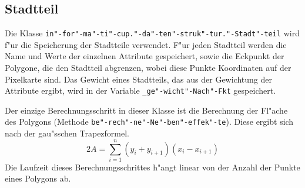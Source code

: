 \subsection{Stadtteil}
Die Klasse \texttt{in"-for"-ma"-ti"-cup."-da"-ten"-struk"-tur."-Stadt"-teil} wird f"ur die Speicherung der Stadtteile verwendet. F"ur jeden Stadtteil werden die Name und Werte der einzelnen Attribute gespeichert, sowie die Eckpunkt der Polygone, die den Stadtteil abgrenzen, wobei diese Punkte Koordinaten auf der Pixelkarte sind. Das Gewicht eines Stadtteils, das aus der Gewichtung der Attribute ergibt, wird in der Variable \texttt{\_ge"-wicht"-Nach"-Fkt} gespeichert.

Der einzige Berechnungsschritt in dieser Klasse ist die Berechnung der Fl"ache des Polygons (Methode \texttt{be"-rech"-ne"-Ne"-ben"-effek"-te}). Diese ergibt sich nach der gau"sschen Trapezformel.
\begin{equation}2 A=\sum_{i=1}^n (y_i + y_{i+1})(x_i-x_{i+1})\end{equation}
Die Laufzeit dieses Berechnungsschrittes h"angt linear von der Anzahl der Punkte eines Polygons ab.

